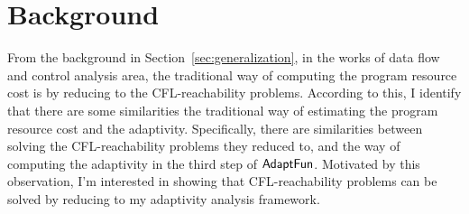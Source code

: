 \section{Background}
\label{subsec:cfl-backgroung}
From the background in Section~\ref{sec:generalization},
in the works of data flow and control analysis area,
the traditional way of computing the program resource cost is
by reducing to the CFL-reachability problems.
%
According to this, 
I identify 
that there are some similarities the traditional way of estimating the program resource cost and 
the adaptivity.
Specifically, there are similarities between solving the CFL-reachability problems they reduced to,
 and the way of computing the adaptivity in 
the third step of $\textsf{AdaptFun}$.
 Motivated by this observation, 
 I'm interested in showing that
 CFL-reachability problems can be solved by reducing to my adaptivity analysis framework.
